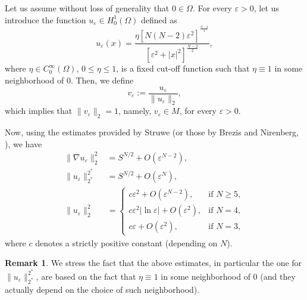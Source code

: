 \documentclass[10pt]{article}
\newcommand{\eps}{\varepsilon}
\theoremstyle{definition}
\newtheorem{remark}[proposition]{Remark}
\numberwithin{equation}{section}
\begin{document}
Let us assume without loss of generality that
$0\in \Omega$. For every
$\eps>0$, let us introduce the function $u_\eps \in H^1_0(\Omega)$ defined as
\begin{equation}\label{eq:def_u_eps}
u_{\varepsilon}(x)=\frac{\eta[N(N-2)\varepsilon^{2}]^{^{\frac{N-2}{4}}}}{[\varepsilon^{2}+ |x|^{2}]^{\frac{N-2}{2}}},
\end{equation}
where $\eta\in C^{\infty}_{0}(\Omega)$, $0\le \eta \le 1$, is a fixed cut-off function
such that $\eta\equiv1$ in some neighborhood of $0$. Then, we define
\[v_{\varepsilon}:=\frac{u_{\varepsilon}}{\|u_{\varepsilon}\|_{2}},\]
which implies that $\|v_{\varepsilon}\|_{2}=1$, namely, $v_{\varepsilon}\in M$, for every $\eps>0$.

Now, using the estimates provided by Struwe \cite[page 179]{Struwebook} (or those by
Brezis and Nirenberg, \cite[eqs. (1.13), (1.29)]{BrezisNirenberg}), we have
\begin{equation}\label{est:struwe}
    \begin{aligned}\displaystyle
\|\nabla u_{\varepsilon}\|_{2}^{2}&=S^{N/2}+O(\varepsilon^{N-2}),\\
\|u_{\varepsilon}\|_{2^{*}}^{2^{*}}&=S^{N/2}+O(\varepsilon^{N}),\\
\|u_{\varepsilon}\|_{2}^{2}&=
\begin{cases}
c \varepsilon^{2}+O(\varepsilon^{N-2}), & \text{if }N\geq5,\\
c \varepsilon^{2}|\ln \varepsilon|+O(\varepsilon^{2}), & \text{if }N=4,\\
c \varepsilon+O(\varepsilon^{2}), & \text{if } N=3,
\end{cases}
    \end{aligned}
\end{equation}
where $c$ denotes a strictly positive constant (depending on $N$).
%
\begin{remark}\label{rmk:why_R}
We stress the fact that the above estimates, in particular the one for 
$\|u_{\varepsilon}\|_{2^{*}}^{2^{*}}$, are based on the fact that $\eta\equiv1$ in some 
neighborhood of $0$ (and they actually depend on the choice of such neighborhood).
\end{remark}
\end{document}
